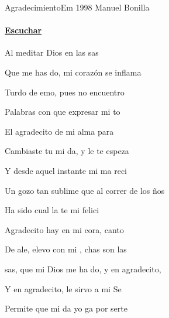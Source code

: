 \documentclass[12pt, spanish]{book}
\begin{document}
    \begin{song}{Agradecimiento}{Em}
    {1998} %
    {Manuel Bonilla}
    {} %
    {}
        \ifChordBk
            \paragraph{\mbox{}\hfill\protect\href{https://open.spotify.com/intl-es/track/0UhjKj2gK0I5z9tlQkZTpz}{Escuchar}\mbox{}\hfill}
        \fi

        \vskip 20pt

        \begin{SBOpGroup}
            Al meditar Dios  en las sas

            Que me has do, mi corazón se inflama

            Turdo de emo, pues no encuentro

            Palabras con que expresar mi to

            El agradecito   de mi alma para 
        \end{SBOpGroup}
        \vskip 20pt
        \begin{SBOpGroup}
            Cambiaste tu mi da, y le te espeza

            Y desde aquel instante mi ma reci

            Un gozo tan sublime que al correr de los ños

            Ha sido cual la te     mi felici
        \end{SBOpGroup}

        \begin{SBChorus}
            Agradecito hay en mi cora, canto

            De ale,   elevo con mi , chas son las

            sas,   que mi Dios me ha do, y en agradecito,

            Y en agradecito, le sirvo a mi Se
        \end{SBChorus}
        \ifChordBk
            \clearpage
        \fi

        \begin{SBOpGroup}
            Permite que mi da yo ga por serte


\end{SBOpGroup}
\end{song}
\end{document}
